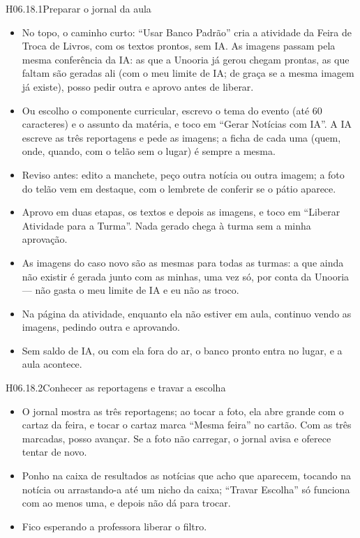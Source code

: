 \begin{historia}{H06.18.1}{Preparar o jornal da aula}{\pronto}
\aceite
\begin{itemize}
  \item No topo, o caminho curto: \enquote{Usar Banco Padrão} cria a atividade
    da Feira de Troca de Livros, com os textos prontos, sem IA. As imagens
    passam pela mesma conferência da IA: as que a Unooria já gerou chegam
    prontas, as que faltam são geradas ali (com o meu limite de IA; de graça se
    a mesma imagem já existe), posso pedir outra e aprovo antes de liberar.
  \item Ou escolho o componente curricular, escrevo o tema do evento (até 60
    caracteres) e o assunto da matéria, e toco em \enquote{Gerar Notícias com
    IA}. A IA escreve as três reportagens e pede as imagens; a ficha de cada
    uma (quem, onde, quando, com o telão sem o lugar) é sempre a mesma.
  \item Reviso antes: edito a manchete, peço outra notícia ou outra imagem; a
    foto do telão vem em destaque, com o lembrete de conferir se o pátio
    aparece.
  \item Aprovo em duas etapas, os textos e depois as imagens, e toco em
    \enquote{Liberar Atividade para a Turma}. Nada gerado chega à turma sem a
    minha aprovação.
  \item As imagens do caso novo são as mesmas para todas
    as turmas: a que ainda não existir é gerada junto com as minhas, uma vez
    só, por conta da Unooria --- não gasta o meu limite de IA e eu não as
    troco.
  \item Na página da atividade, enquanto ela não estiver em aula, continuo
    vendo as imagens, pedindo outra e aprovando.
  \item Sem saldo de IA, ou com ela fora do ar, o banco pronto entra no
    lugar, e a aula acontece.
\end{itemize}
\end{historia}

\begin{historia}{H06.18.2}{Conhecer as reportagens e travar a escolha}{\pronto}
\aceite
\begin{itemize}
  \item O jornal mostra as três reportagens; ao tocar a foto, ela abre grande
    com o cartaz da feira, e tocar o cartaz marca \enquote{Mesma feira} no
    cartão. Com as três marcadas, posso avançar. Se a foto não carregar, o
    jornal avisa e oferece tentar de novo.
  \item Ponho na caixa de resultados as notícias que acho que aparecem,
    tocando na notícia ou arrastando-a até um nicho da caixa;
    \enquote{Travar Escolha} só funciona com ao menos uma, e depois não dá para
    trocar.
  \item Fico esperando a professora liberar o filtro.
\end{itemize}
\end{historia}

